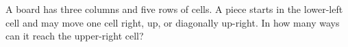 A board has three columns and five rows of cells. A piece starts in the lower-left cell and may move one cell right, up, or diagonally up-right. In how many ways can it reach the upper-right cell?
